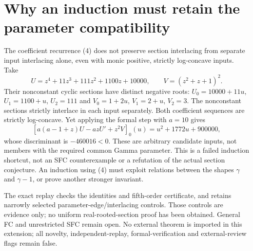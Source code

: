 \documentclass[11pt]{article}
\begin{document}
\section{Why an induction must retain the parameter compatibility}
The coefficient recurrence (4) does not preserve section interlacing
from separate input interlacing alone, even with monic positive,
strictly log-concave inputs. Take
\[
 U=z^4+11z^3+111z^2+1100z+10000,\qquad V=(z^2+z+1)^2.
\]
Their nonconstant cyclic sections have distinct negative roots:
$U_0=10000+11u$, $U_1=1100+u$, $U_2=111$ and
$V_0=1+2u$, $V_1=2+u$, $V_2=3$.
The nonconstant sections strictly interlace in each input separately.
Both coefficient sequences are strictly log-concave.
Yet applying the formal step with $a=10$ gives
\[
 [a(a-1+z)U-azU'+z^2V]_0(u)=u^2+1772u+900000,
\]
whose discriminant is $-460016<0$.
These are arbitrary candidate inputs, not members with the required
common Gamma parameter. This is a failed induction shortcut, not an
SFC counterexample or a refutation of the actual section conjecture.
An induction using (4) must exploit relations between the shapes
$\gamma$ and $\gamma-1$, or prove another stronger invariant.

The exact replay checks the identities and fifth-order certificate,
and retains narrowly selected parameter-edge/interlacing controls.
Those controls are evidence only; no uniform real-rooted-section
proof has been obtained. General FC and unrestricted SFC remain open.
No external theorem is imported in this extension; all novelty,
independent-replay, formal-verification and external-review flags remain false.
\end{document}
